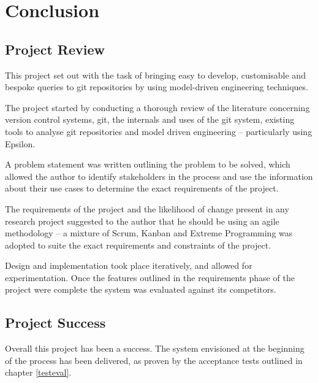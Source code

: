 \documentclass[11pt]{book}
\begin{document}

\chapter{Conclusion}
\section{Project Review}
This project set out with the task of bringing easy to develop, customisable and bespoke queries to git repositories by using model-driven engineering techniques. 

The project started by conducting a thorough review of the literature concerning version control systems, git, the internals and uses of the git system, existing tools to analyse git repositories and model driven engineering -- particularly using Epsilon.

A problem statement was written outlining the problem to be solved, which allowed the author to identify stakeholders in the process and use the information about their use cases to determine the exact requirements of the project.

The requirements of the project and the likelihood of change present in any research project suggested to the author that he should be using an agile methodology -- a mixture of Scrum, Kanban and Extreme Programming was adopted to suite the exact requirements and constraints of the project.

Design and implementation took place iteratively, and allowed for experimentation. Once the features outlined in the requirements phase of the project were complete the system was evaluated against its competitors.

\section{Project Success}
Overall this project has been a success. The system envisioned at the beginning of the process has been delivered, as proven by the acceptance tests outlined in chapter \ref{testeval}.
\end{document}
